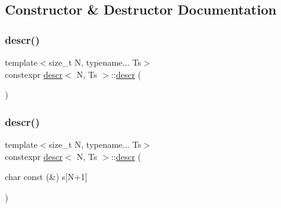 \subsection{Constructor \& Destructor Documentation}
\mbox{\label{structdescr_a0bc466eee765ce14e9146d914d326fb3}} 
\subsubsection{\texorpdfstring{descr()}{descr()}\hspace{0.1cm}{\footnotesize\ttfamily [1/4]}}
{\footnotesize\ttfamily template$<$size\+\_\+t N, typename... Ts$>$ \\
constexpr \mbox{\hyperlink{structdescr}{descr}}$<$ N, Ts $>$\+::\mbox{\hyperlink{structdescr}{descr}} (\begin{DoxyParamCaption}{ }\end{DoxyParamCaption})\hspace{0.3cm}{\ttfamily [inline]}}

\mbox{\label{structdescr_ad61bf6ae3323c8a562a64b8cffe28f38}} 
\subsubsection{\texorpdfstring{descr()}{descr()}\hspace{0.1cm}{\footnotesize\ttfamily [2/4]}}
{\footnotesize\ttfamily template$<$size\+\_\+t N, typename... Ts$>$ \\
constexpr \mbox{\hyperlink{structdescr}{descr}}$<$ N, Ts $>$\+::\mbox{\hyperlink{structdescr}{descr}} (\begin{DoxyParamCaption}\item[{char const (\&)}]{s\mbox{[}\+N+1\mbox{]} }\end{DoxyParamCaption})\hspace{0.3cm}{\ttfamily [inline]}}

\mbox{\label{structdescr_a1a50be3843503213c2d68a7ba41a3462}} 

